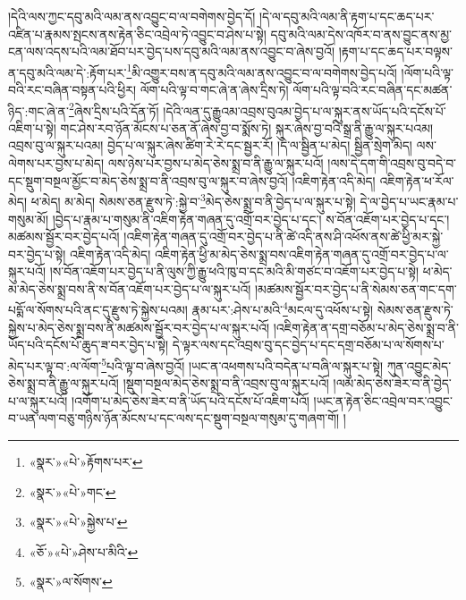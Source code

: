 །དེའི་ལས་ཀྱང་དབུ་མའི་ལམ་ནས་འབྱུང་བ་ལ་བགེགས་བྱེད་དོ། །དེ་ལ་དབུ་མའི་ལམ་ནི་རྟག་པ་དང་ཆད་པར་འཛིན་པ་རྣམས་སྤངས་ནས་རྟེན་ཅིང་འབྲེལ་ཏེ་འབྱུང་བ་ཤེས་པ་སྟེ། དབུ་མའི་ལམ་དེས་འཁོར་བ་ནས་བྱུང་ནས་མྱ་ངན་ལས་འདས་པའི་ལམ་ཐོབ་པར་བྱེད་པས་དབུ་མའི་ལམ་ནས་འབྱུང་བ་ཞེས་བྱའོ། །རྟག་པ་དང་ཆད་པར་བལྟས་ན་དབུ་མའི་ལམ་དེ་:རྟོག་པར་\footnote{«སྣར་»«པེ་»རྟོགས་པར་}མི་འགྱུར་བས་ན་དབུ་མའི་ལམ་ནས་འབྱུང་བ་ལ་བགེགས་བྱེད་པའོ། །ལོག་པའི་ལྟ་བའི་རང་བཞིན་བསྟན་པའི་ཕྱིར། ལོག་པའི་ལྟ་བ་གང་ཞེ་ན་ཞེས་དྲིས་ཏེ། ལོག་པའི་ལྟ་བའི་རང་བཞིན་དང་མཚན་ཉིད་:གང་ཞེ་ན་\footnote{«སྣར་»«པེ་»གང་}ཞེས་དྲིས་པའི་དོན་ཏོ། །དེའི་ལན་དུ་རྒྱུའམ་འབྲས་བུའམ་བྱེད་པ་ལ་སྐུར་ནས་ཡོད་པའི་དངོས་པོ་འཇིག་པ་སྟེ། གང་ཤེས་རབ་ཉོན་མོངས་པ་ཅན་ནོ་ཞེས་བྱ་བ་སྨོས་ཏེ། སྐུར་ཞེས་བྱ་བའི་སྒྲ་ནི་རྒྱུ་ལ་སྐུར་པའམ། འབྲས་བུ་ལ་སྐུར་པའམ། བྱེད་པ་ལ་སྐུར་ཞེས་ཚིག་རེ་རེ་དང་སྦྱར་རོ། །དེ་ལ་སྦྱིན་པ་མེད། སྦྱིན་སྲེག་མེད། ལས་ལེགས་པར་བྱས་པ་མེད། ལས་ཉེས་པར་བྱས་པ་མེད་ཅེས་སྨྲ་བ་ནི་རྒྱུ་ལ་སྐུར་པའོ། །ལས་དེ་དག་གི་འབྲས་བུ་བདེ་བ་དང་སྡུག་བསྔལ་མྱོང་བ་མེད་ཅེས་སྨྲ་བ་ནི་འབྲས་བུ་ལ་སྐུར་བ་ཞེས་བྱའོ། །འཇིག་རྟེན་འདི་མེད། འཇིག་རྟེན་ཕ་རོལ་མེད། ཕ་མེད། མ་མེད། སེམས་ཅན་རྫུས་ཏེ་:སྐྱེ་བ་\footnote{«སྣར་»«པེ་»སྐྱེས་པ་}མེད་ཅེས་སྨྲ་བ་ནི་བྱེད་པ་ལ་སྐུར་པ་སྟེ། དེ་ལ་བྱེད་པ་ཡང་རྣམ་པ་གསུམ་མོ། །བྱེད་པ་རྣམ་པ་གསུམ་ནི་འཇིག་རྟེན་གཞན་དུ་འགྲོ་བར་བྱེད་པ་དང་། ས་བོན་འཇོག་པར་བྱེད་པ་དང་། མཚམས་སྦྱོར་བར་བྱེད་པའོ། །འཇིག་རྟེན་གཞན་དུ་འགྲོ་བར་བྱེད་པ་ནི་ཚེ་འདི་ནས་ཤི་འཕོས་ནས་ཚེ་ཕྱི་མར་སྐྱེ་བར་བྱེད་པ་སྟེ། འཇིག་རྟེན་འདི་མེད། འཇིག་རྟེན་ཕྱི་མ་མེད་ཅེས་སྨྲ་བས་འཇིག་རྟེན་གཞན་དུ་འགྲོ་བར་བྱེད་པ་ལ་སྐུར་པའོ། །ས་བོན་འཇོག་པར་བྱེད་པ་ནི་ལུས་ཀྱི་རྒྱུ་ཕའི་ཁུ་བ་དང་མའི་མི་གཙང་བ་འཇོག་པར་བྱེད་པ་སྟེ། ཕ་མེད་མ་མེད་ཅེས་སྨྲ་བས་ནི་ས་བོན་འཇོག་པར་བྱེད་པ་ལ་སྐུར་པའོ། །མཚམས་སྦྱོར་བར་བྱེད་པ་ནི་སེམས་ཅན་གང་དག་པདྨོ་ལ་སོགས་པའི་ནང་དུ་རྫུས་ཏེ་སྐྱེས་པའམ། རྣམ་པར་:ཤེས་པ་མའི་\footnote{«ཅོ་»«པེ་»ཤེས་པ་མིའི་}མངལ་དུ་འཕོས་པ་སྟེ། སེམས་ཅན་རྫུས་ཏེ་སྐྱེས་པ་མེད་ཅེས་སྨྲ་བས་ནི་མཚམས་སྦྱོར་བར་བྱེད་པ་ལ་སྐུར་པའོ། །འཇིག་རྟེན་ན་དགྲ་བཅོམ་པ་མེད་ཅེས་སྨྲ་བ་ནི་ཡོད་པའི་དངོས་པོ་ཆུད་ཟ་བར་བྱེད་པ་སྟེ། དེ་ལྟར་ལས་དང་འབྲས་བུ་དང་བྱེད་པ་དང་དགྲ་བཅོམ་པ་ལ་སོགས་པ་མེད་པར་ལྟ་བ་:ལ་ལོག་\footnote{«སྣར་»ལ་སོགས་}པའི་ལྟ་བ་ཞེས་བྱའོ། །ཡང་ན་འཕགས་པའི་བདེན་པ་བཞི་ལ་སྐུར་པ་སྟེ། ཀུན་འབྱུང་མེད་ཅེས་སྨྲ་བ་ནི་རྒྱུ་ལ་སྐུར་པའོ། །སྡུག་བསྔལ་མེད་ཅེས་སྨྲ་བ་ནི་འབྲས་བུ་ལ་སྐུར་པའོ། །ལམ་མེད་ཅེས་ཟེར་བ་ནི་བྱེད་པ་ལ་སྐུར་པའོ། །འགོག་པ་མེད་ཅེས་ཟེར་བ་ནི་ཡོད་པའི་དངོས་པོ་འཇིག་པའོ། །ཡང་ན་རྟེན་ཅིང་འབྲེལ་བར་འབྱུང་བ་ཡན་ལག་བཅུ་གཉིས་ཉོན་མོངས་པ་དང་ལས་དང་སྡུག་བསྔལ་གསུམ་དུ་གཞག་གོ། །
